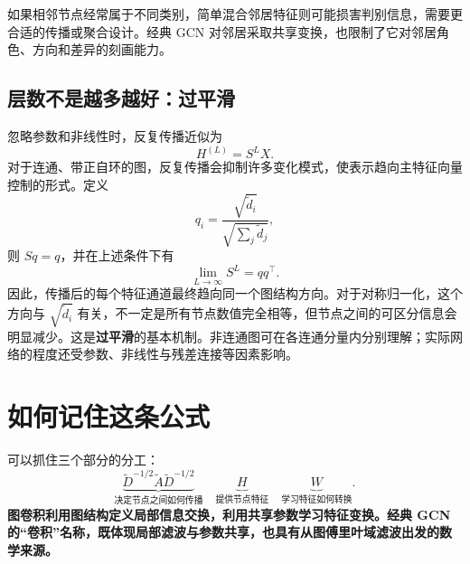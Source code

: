 \documentclass[UTF8,a4paper,11pt,fontset=fandol]{ctexart}
\begin{document}
如果相邻节点经常属于不同类别，简单混合邻居特征则可能损害判别信息，需要更合适的传播或聚合设计。经典 GCN 对邻居采取共享变换，也限制了它对邻居角色、方向和差异的刻画能力。

\subsection{层数不是越多越好：过平滑}
忽略参数和非线性时，反复传播近似为
\begin{equation}
H^{(L)}=S^LX.
\end{equation}
对于连通、带正自环的图，反复传播会抑制许多变化模式，使表示趋向主特征向量控制的形式。定义
\begin{equation}
q_i=\frac{\sqrt{\widetilde d_i}}{\sqrt{\sum_j\widetilde d_j}},
\end{equation}
则 $Sq=q$，并在上述条件下有
\begin{equation}
\lim_{L\to\infty}S^L=qq^\top.
\end{equation}
因此，传播后的每个特征通道最终趋向同一个图结构方向。对于对称归一化，这个方向与 $\sqrt{\widetilde d_i}$ 有关，不一定是所有节点数值完全相等，但节点之间的可区分信息会明显减少。这是\textbf{过平滑}的基本机制。非连通图可在各连通分量内分别理解；实际网络的程度还受参数、非线性与残差连接等因素影响。

\section{如何记住这条公式}
可以抓住三个部分的分工：
\begin{equation}
\underbrace{\widetilde D^{-1/2}\widetilde A\widetilde D^{-1/2}}_{\text{决定节点之间如何传播}}
\quad
\underbrace{H}_{\text{提供节点特征}}
\quad
\underbrace{W}_{\text{学习特征如何转换}}.
\end{equation}
\textbf{图卷积利用图结构定义局部信息交换，利用共享参数学习特征变换。经典 GCN 的“卷积”名称，既体现局部滤波与参数共享，也具有从图傅里叶域滤波出发的数学来源。}
\end{document}
